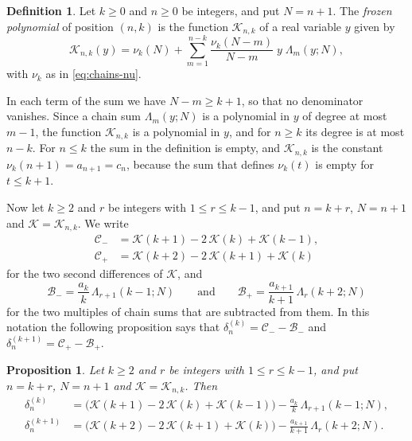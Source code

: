 \documentclass{amsart}
\newtheorem{proposition}[theorem]{Proposition}
\theoremstyle{definition}
\newtheorem{definition}[theorem]{Definition}
\theoremstyle{remark}
\numberwithin{equation}{section}
\begin{document}
\begin{definition}\label{def:frozen}
Let $k\ge 0$ and $n\ge 0$ be integers, and put $N=n+1$. The \emph{frozen polynomial} of position $(n,k)$ is the function $\mathcal K_{n,k}$ of a real variable $y$ given by
\[
\mathcal K_{n,k}(y)=\nu_k(N)+\sum_{m=1}^{n-k}\frac{\nu_k(N-m)}{N-m}\;y\;\Lambda_m(y;N),
\]
with $\nu_k$ as in \eqref{eq:chains-nu}.
\end{definition}

In each term of the sum we have $N-m\ge k+1$, so that no denominator vanishes. Since a chain sum $\Lambda_m(y;N)$ is a polynomial in $y$ of degree at most $m-1$, the function $\mathcal K_{n,k}$ is a polynomial in $y$, and for $n\ge k$ its degree is at most $n-k$. For $n\le k$ the sum in the definition is empty, and $\mathcal K_{n,k}$ is the constant $\nu_k(n+1)=a_{n+1}=c_n$, because the sum that defines $\nu_k(t)$ is empty for $t\le k+1$.

Now let $k\ge 2$ and $r$ be integers with $1\le r\le k-1$, and put $n=k+r$, $N=n+1$ and $\mathcal K=\mathcal K_{n,k}$. We write
\begin{align*}
\mathcal C_-&=\mathcal K(k+1)-2\,\mathcal K(k)+\mathcal K(k-1),\\
\mathcal C_+&=\mathcal K(k+2)-2\,\mathcal K(k+1)+\mathcal K(k)
\end{align*}
for the two second differences of $\mathcal K$, and
\[
\mathcal B_-=\frac{a_k}{k}\,\Lambda_{r+1}(k-1;N)\qquad\text{and}\qquad\mathcal B_+=\frac{a_{k+1}}{k+1}\,\Lambda_{r}(k+2;N)
\]
for the two multiples of chain sums that are subtracted from them. In this notation the following proposition says that $\delta^{(k)}_n=\mathcal C_--\mathcal B_-$ and $\delta^{(k+1)}_n=\mathcal C_+-\mathcal B_+$.

\begin{proposition}\label{prop:curvatureboundary}
Let $k\ge 2$ and $r$ be integers with $1\le r\le k-1$, and put $n=k+r$, $N=n+1$ and $\mathcal K=\mathcal K_{n,k}$. Then
\begin{align*}
\delta^{(k)}_n&=\bigl(\mathcal K(k+1)-2\,\mathcal K(k)+\mathcal K(k-1)\bigr)-\frac{a_k}{k}\,\Lambda_{r+1}(k-1;N),\\
\delta^{(k+1)}_n&=\bigl(\mathcal K(k+2)-2\,\mathcal K(k+1)+\mathcal K(k)\bigr)-\frac{a_{k+1}}{k+1}\,\Lambda_{r}(k+2;N).
\end{align*}
\end{proposition}
\end{document}
